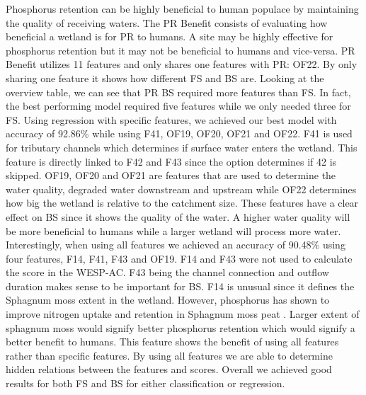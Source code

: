 \documentclass[12pt,letterpaper]{article}
\begin{document}
Phosphorus retention can be highly beneficial to human populace by maintaining the quality of receiving waters.
The PR Benefit consists of evaluating how beneficial a wetland is for PR to humans.
A site may be highly effective for phosphorus retention but it may not be beneficial to humans and vice-versa.
PR Benefit utilizes 11 features and only shares one features with PR: OF22.
By only sharing one feature it shows how different \ac{FS} and \ac{BS} are.
Looking at the overview table, we can see that \ac{PR} \ac{BS} required more features than \ac{FS}.
In fact, the best performing model required five features while we only needed three for \ac{FS}.
Using regression with specific features, we achieved our best model with accuracy of 92.86\% while using F41, OF19, OF20, OF21 and OF22.
F41 is used for tributary channels which determines if surface water enters the wetland.
This feature is directly linked to F42 and F43 since the option determines if 42 is skipped.
OF19, OF20 and OF21 are features that are used to determine the water quality, degraded water downstream and upstream while OF22 determines how big the wetland is relative to the catchment size.
These features have a clear effect on \ac{BS} since it shows the quality of the water.
A higher water quality will be more beneficial to humans while a larger wetland will process more water.
Interestingly, when using all features we achieved an accuracy of 90.48\% using four features,  F14, F41, F43 and OF19.
F14 and F43 were not used to calculate the score in the WESP-AC.
F43 being the channel connection and outflow duration makes sense to be important for \ac{BS}.
F14 is unusual since it defines the Sphagnum moss extent in the wetland.
However, phosphorus has shown to improve nitrogen uptake and retention in Sphagnum moss peat \cite{williams1999nitrogen}.
Larger extent of sphagnum moss would signify better phosphorus retention which would signify a better benefit to humans.
This feature shows the benefit of using all features rather than specific features.
By using all features we are able to determine hidden relations between the features and scores.
Overall we achieved good results for both \ac{FS} and \ac{BS} for either classification or regression.
\end{document}

